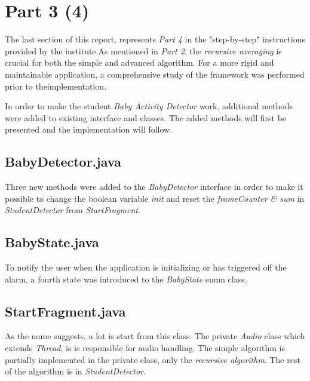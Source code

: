 \newpage
\section{Part 3 (4)}
The last section of this report, represents \emph{Part 4} in the "step-by-step"
instructions provided by the institute.As mentioned in \emph{Part 2}, the 
\emph{recursive averaging} is crucial for both the simple and advanced algorithm. 
For a more rigid and maintainable application, a comprehensive study of the 
framework was performed prior to theimplementation. 

In order to make the student \emph{Baby Activity Detector} work, additional
methods were added to existing interface and classes. The added methods will
first be presented and the implementation will follow.

\subsection{BabyDetector.java}
Three new methods were added to the \emph{BabyDetector} interface in order to
make it possible to change the boolean variable \emph{init} and reset the 
\emph{frameCounter \& sum} in \emph{StudentDetector} from 
\emph{StartFragment}.  



\subsection{BabyState.java}
To notify the user when the application is initializing or has
triggered off the alarm, a fourth state was introduced to the \emph{BabyState}
enum class. 



\subsection{StartFragment.java}
As the name suggests, a lot is start from this class. The private \emph{Audio}
class which extends \emph{Thread}, is is responsible for audio handling. The
simple algorithm is partially implemented in the private class, only
the \emph{recursive algorithm}. The rest of the algorithm is in
\emph{StudentDetector}. 



